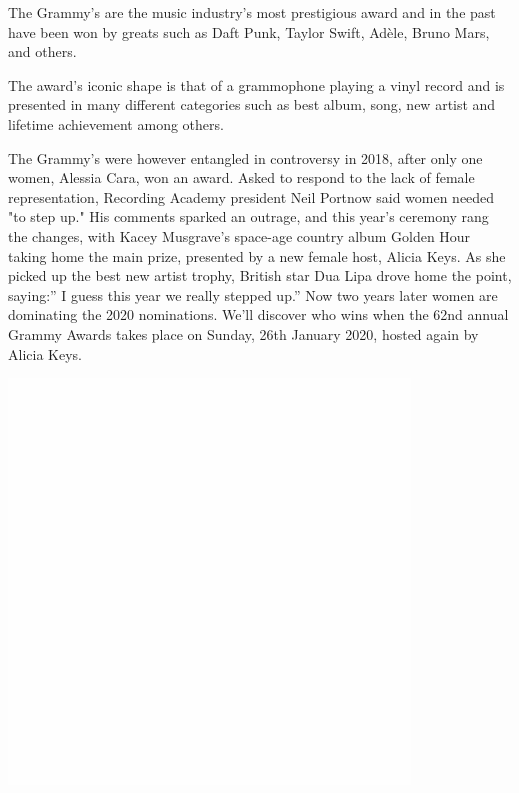 \documentclass{article}
\begin{document}
\pagebreak



\begin{multicols}{2}


The Grammy's are the music industry's most prestigious award and in the past have been won by greats such as Daft Punk, Taylor Swift, Adèle, Bruno Mars, and others. 

The award's iconic shape is that of a grammophone playing a vinyl record and is presented in many different categories such as best album, song, new artist and lifetime achievement among others.

The Grammy’s were however entangled in controversy in 2018, after only one women, Alessia Cara, won an award. Asked to respond to the lack of female representation, Recording Academy president Neil Portnow said women needed "to step up." His comments sparked an outrage, and this year’s ceremony rang the changes, with Kacey Musgrave’s space-age country album Golden Hour taking home the main prize, presented by a new female host, Alicia Keys. As she picked up the best new artist trophy, British star Dua Lipa drove home the point, saying:” I guess this year we really stepped up.” Now two years later women are dominating the 2020 nominations. We’ll discover who wins when the 62nd annual Grammy Awards takes place on Sunday, 26th January 2020, hosted again by Alicia Keys.


\includegraphics[scale=0.1]{w}
\vfill


\end{multicols}
\end{document}
